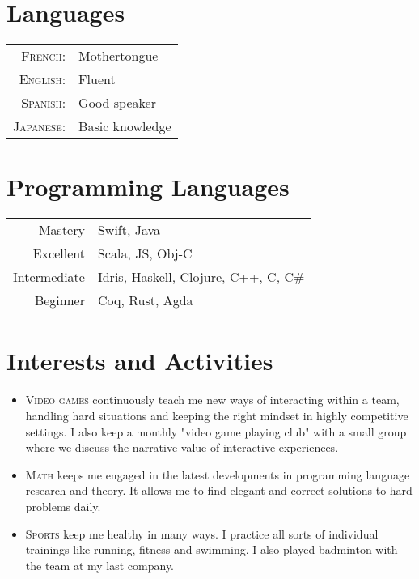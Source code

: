\documentclass[a4paper,10pt]{article} %
\begin{document}

\section{Languages}

\begin{tabular}{rl}
\textsc{French:} & Mothertongue\\

\textsc{English:} & Fluent\\

\textsc{Spanish:} & Good speaker\\

\textsc{Japanese:} & Basic knowledge\\

\end{tabular}


\section{Programming Languages}

\begin{tabular}{r|l}
Mastery & Swift, Java\\
Excellent & Scala, JS, Obj-C\\
Intermediate & Idris, Haskell, Clojure, C++, C, C\#\\
Beginner & Coq, Rust, Agda\\
\end{tabular}

\section{Interests and Activities}
\begin{itemize}
	\item \textsc{Video games} continuously teach me new ways of interacting within a team, handling hard situations and keeping the right mindset in highly competitive settings. I also keep a monthly "video game playing club" with a small group where we discuss the narrative value of interactive experiences.
	\item \textsc{Math} keeps me engaged in the latest developments in programming language research and theory. It allows me to find elegant and correct solutions to hard problems daily.
	\item \textsc{Sports} keep me healthy in many ways. I practice all sorts of individual trainings like running, fitness and swimming. I also played badminton with the team at my last company.
\end{itemize}
\end{document}

